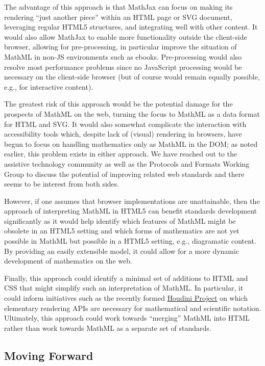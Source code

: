 \documentclass[]{amsart}
\begin{document}
The advantage of this approach is that MathJax can focus on making its
rendering ``just another piece'' within an HTML page or SVG document,
leveraging regular HTML5 structures, and integrating well with other
content. It would also allow MathJax to enable more functionality
outside the client-side browser, allowing for pre-processing, in
particular improve the situation of MathML in non-JS environments such
as ebooks. Pre-processing would also resolve most performance problems
since no JavaScript processing would be necessary on the client-side
browser (but of course would remain equally possible, e.g., for
interactive content).

The greatest risk of this approach would be the potential damage for the
prospects of MathML on the web, turning the focus to MathML as a data
format for HTML and SVG. It would also somewhat complicate the
interaction with accessibility tools which, despite lack of (visual)
rendering in browsers, have begun to focus on handling mathematics only
as MathML in the DOM; as noted earlier, this problem exists in either
approach. We have reached out to the assistive technology community as
well as the Protocols and Formats Working Group to discuss the potential
of improving related web standards and there seems to be interest from
both sides.

However, if one assumes that browser implementations are unattainable,
then the approach of interpreting MathML in HTML5 can benefit standards
development significantly as it would help identify which features of
MathML might be obsolete in an HTML5 setting and which forms of
mathematics are not yet possible in MathML but possible in a HTML5
setting, e.g., diagramatic content. By providing an easily extensible
model, it could allow for a more dynamic development of mathematics on
the web.

Finally, this approach could identify a minimal set of additions to HTML
and CSS that might simplify such an interpretation of MathML. In
particular, it could inform initiatives such as the recently formed
\href{https://wiki.css-houdini.org/}{Houdini Project} on which
elementary rendering APIs are necessary for mathematical and scientific
notation. Ultimately, this approach could work towards ``merging''
MathML into HTML rather than work towards MathML as a separate set of
standards.

\subsection{Moving Forward}\label{moving-forward}
\end{document}
